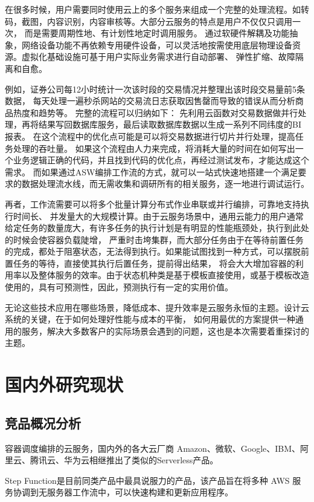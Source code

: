 在很多时候，用户需要同时使用云上的多个服务来组成一个完整的处理流程。如转码，截图，内容识别，内容审核等。大部分云服务的特点是用户不仅仅只调用一次，
而是需要周期性地、有计划性地定时调用服务。
通过软硬件解耦及功能抽象，网络设备功能不再依赖专用硬件设备，可以灵活地按需使用底层物理设备资源。虚拟化基础设施可基于用户实际业务需求进行自动部署、
弹性扩缩、故障隔离和自愈。

例如，证券公司每12小时统计一次该时段的交易情况并整理出该时段交易量前5条数据，
每天处理一遍秒杀网站的交易流日志获取因售罄而导致的错误从而分析商品热度和趋势等。
完整的流程可以归纳如下： 先利用云函数对交易数据做并行处理，再将结果写回数据库服务，最后读取数据库数据以生成一系列不同纬度的BI报表。
在这个流程中的优化点可能是可以将交易数据进行切片并行处理，提高任务处理的吞吐量。
如果这个流程由人力来完成，将消耗大量的时间在如何写出一个业务逻辑正确的代码，并且找到代码的优化点，再经过测试发布，才能达成这个需求。
而如果通过ASW编排工作流的方式，就可以一站式快速地搭建一个满足要求的数据处理流水线，而无需收集和调研所有的相关服务，逐一地进行调试运行。

再者，工作流需要可以将多个批量计算分布式作业串联或并行编排，可靠地支持执行时间长、
并发量大的大规模计算。由于云服务场景中，通用云能力的用户通常给定任务的数量庞大，有许多任务的执行计划是有明显的性能瓶颈处，执行到此处的时候会使容器负载陡增，
严重时击垮集群，而大部分任务由于在等待前置任务的完成，都处于阻塞状态，无法得到执行。如果能试图找到一种方式，可以摆脱前置任务的等待，直接使其执行后置任务，提前得出结果，
将会大大增加容器的利用率以及整体服务的效率。由于状态机种类是基于模板直接使用，或基于模板改造使用的，具有可预测性，因此，预测执行有一定的实用价值。

无论这些技术应用在哪些场景，降低成本、提升效率是云服务永恒的主题。设计云系统的关键，在于如何处理好性能与成本的平衡，
如何用最优的方案提供一种通用的服务，解决大多数客户的实际场景会遇到的问题\cite{lu2021microservice}，这也是本次需要着重探讨的主题。


\section{国内外研究现状}

\subsection{竞品概况分析}
容器调度编排的云服务，国内外的各大云厂商 Amazon、微软、Google、IBM、阿里云、腾讯云、华为云相继推出了类似的Serverless产品。

Step Function是目前同类产品中最具说服力的产品，该产品旨在将多种 AWS 服务协调到无服务器工作流中，可以快速构建和更新应用程序\cite{jywfbpxt}。


